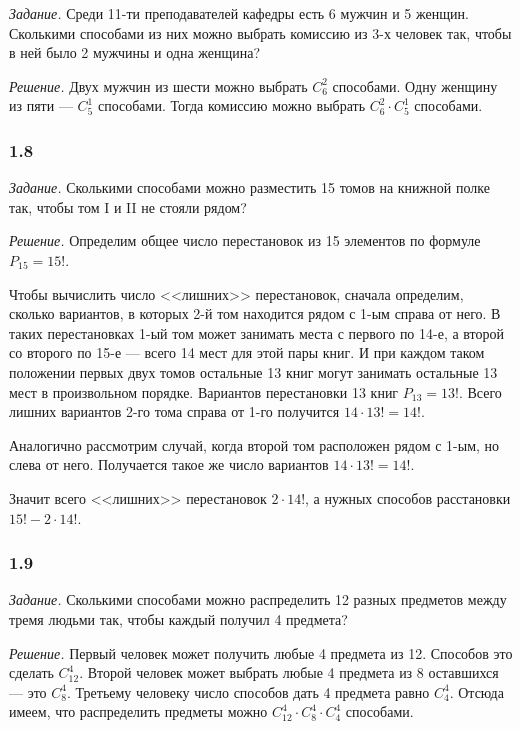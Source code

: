 \documentclass{book}
\begin{document}
\textit{Задание.} Среди 11-ти преподавателей кафедры есть 6 мужчин и 5 женщин. Сколькими способами из них можно выбрать комиссию из 3-х человек так, чтобы в ней было 2 мужчины и одна женщина?

\textit{Решение.} Двух мужчин из шести можно выбрать $C_6^2$ способами. Одну женщину из пяти --- $C_5^1$ способами. Тогда комиссию можно выбрать $C_6^2\cdot C_5^1$ способами.

\subsubsection*{1.8}

\textit{Задание.} Сколькими способами можно разместить 15 томов на книжной полке так, чтобы том I и II не стояли рядом?

\textit{Решение.} Определим общее число перестановок из 15 элементов по формуле $P_{15}=15!$.

Чтобы вычислить число <<лишних>> перестановок, сначала определим, сколько вариантов, в которых 2-й том находится рядом с 1-ым справа от него. В таких перестановках 1-ый том может занимать места с первого по 14-е, а второй со второго по 15-е --- всего 14 мест для этой пары книг. И при каждом таком положении первых двух томов остальные 13 книг могут занимать остальные 13 мест в произвольном порядке. Вариантов перестановки 13 книг $P_{13}=13!$. Всего лишних вариантов 2-го тома справа от 1-го получится $14\cdot 13!=14!$.

Аналогично рассмотрим случай, когда второй том расположен рядом с 1-ым, но слева от него. Получается такое же число вариантов $14\cdot 13!=14!$.

Значит всего <<лишних>> перестановок $2\cdot 14!$, а нужных способов расстановки $15!-2\cdot 14!$.

\subsubsection*{1.9}

\textit{Задание.} Сколькими способами можно распределить 12 разных предметов между тремя людьми так, чтобы каждый получил 4 предмета?

\textit{Решение.} Первый человек может получить любые 4 предмета из 12. Способов это сделать $C_{12}^4$. Второй человек может выбрать любые 4 предмета из 8 оставшихся --- это $C_8^4$. Третьему человеку число способов дать 4 предмета равно $C_4^4$. Отсюда имеем, что распределить предметы можно $C_{12}^4\cdot C_8^4\cdot C_4^4$ способами.
\end{document}
